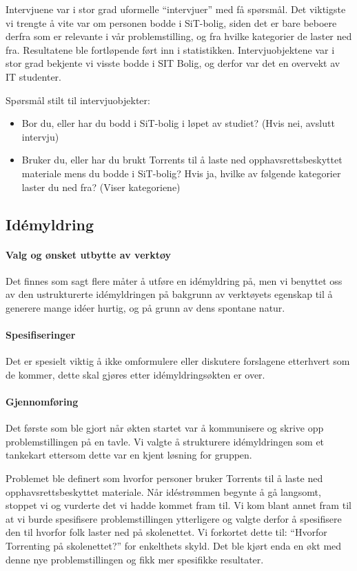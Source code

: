 Intervjuene var i stor grad uformelle ``intervjuer'' med få spørsmål. Det viktigste vi trengte å vite var om personen bodde i SiT-bolig, siden det er bare beboere derfra som er relevante i vår problemstilling, og fra hvilke kategorier de laster ned fra. Resultatene ble fortløpende ført inn i statistikken. Intervjuobjektene var i stor grad bekjente vi visste bodde i SIT Bolig, og derfor var det en overvekt av IT studenter.

Spørsmål stilt til intervjuobjekter:
\begin{itemize}
    \item Bor du, eller har du bodd i SiT-bolig i løpet av studiet? (Hvis nei, avslutt intervju)
    \item Bruker du, eller har du brukt Torrents til å laste ned opphavsrettsbeskyttet materiale mens du bodde i SiT-bolig? Hvis ja, hvilke av følgende kategorier laster du ned fra? (Viser kategoriene)
\end{itemize}


\subsection{Idémyldring}

\paragraph{Valg og ønsket utbytte av verktøy}
Det finnes som sagt flere måter å utføre en idémyldring på, men vi benyttet oss av den ustrukturerte idémyldringen på bakgrunn av verktøyets egenskap til å generere mange idéer hurtig, og på grunn av dens spontane natur. 

\paragraph{Spesifiseringer}
Det er spesielt viktig å ikke omformulere eller diskutere forslagene etterhvert som de kommer, dette skal gjøres etter idémyldringsøkten er over.

\paragraph{Gjennomføring}
Det første som ble gjort når økten startet var å kommunisere og skrive opp problemstillingen på en tavle. Vi valgte å strukturere idémyldringen som et tankekart ettersom dette var en kjent løsning for gruppen. 

Problemet ble definert som hvorfor personer bruker Torrents til å laste ned opphavsrettsbeskyttet materiale. Når idéstrømmen begynte å gå langsomt, stoppet vi og vurderte det vi hadde kommet fram til. Vi kom blant annet fram til at vi burde spesifisere problemstillingen ytterligere og valgte derfor å spesifisere den til hvorfor folk laster ned på skolenettet. Vi forkortet dette til: ``Hvorfor Torrenting på skolenettet?'' for enkelthets skyld. Det ble kjørt enda en økt med denne nye problemstillingen og fikk mer spesifikke resultater.


